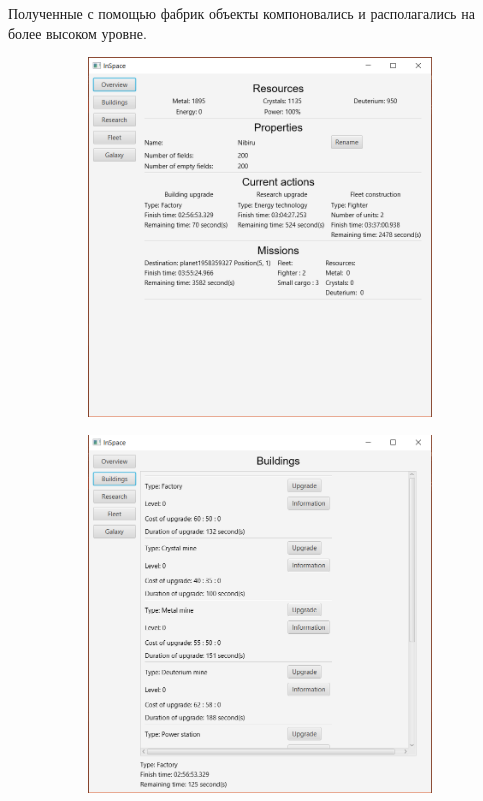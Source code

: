 Полученные с помощью фабрик объекты компоновались и располагались на более высоком уровне.
\begin{figure}[H]
\centering
\begin{subfigure}[b]{0.3\textwidth} 
\includegraphics[width=1\textwidth]{../screenshots/1.png}
\end{subfigure}
\begin{subfigure}[b]{0.3\textwidth} 
\includegraphics[width=1\textwidth]{../screenshots/2.png}

\end{subfigure}
\end{figure}
